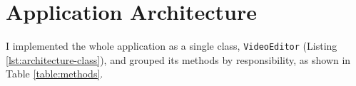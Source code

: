\section{Application Architecture}
\label{sec:architecture}



I implemented the whole application as a single class,
\texttt{VideoEditor} (Listing \ref{lst:architecture-class}), and
grouped its methods by responsibility, as shown in Table
\ref{table:methods}.



